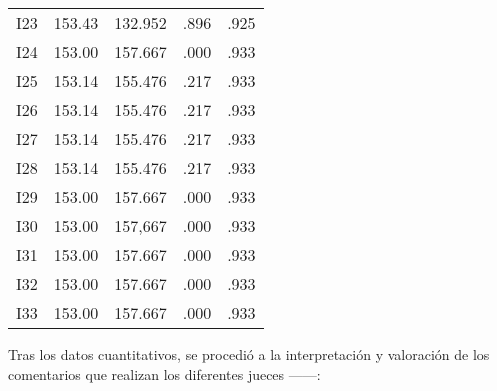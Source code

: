\documentclass[spanish]{textolivre}
\begin{document}
\begin{table}[htbp]
\begin{threeparttable}
\begin{small}
\begin{tabular}{lllll}
I23 & 153.43 & 132.952 & .896 & .925 \\
I24 & 153.00 & 157.667 & .000 & .933 \\
I25 & 153.14 & 155.476 & .217 & .933 \\
I26 & 153.14 & 155.476 & .217 & .933 \\
I27 & 153.14 & 155.476 & .217 & .933 \\
I28 & 153.14 & 155.476 & .217 & .933 \\
I29 & 153.00 & 157.667 & .000 & .933 \\
I30 & 153.00 & 157,667 & .000 & .933 \\
I31 & 153.00 & 157.667 & .000 & .933 \\
I32 & 153.00 & 157.667 & .000 & .933 \\
I33 & 153.00 & 157.667 & .000 & .933 \\
\bottomrule
\end{tabular}
\end{small}
\end{threeparttable}
\end{table}

Tras los datos cuantitativos, se procedió a la interpretación y valoración de los comentarios que realizan los diferentes jueces ——:
\end{document}
